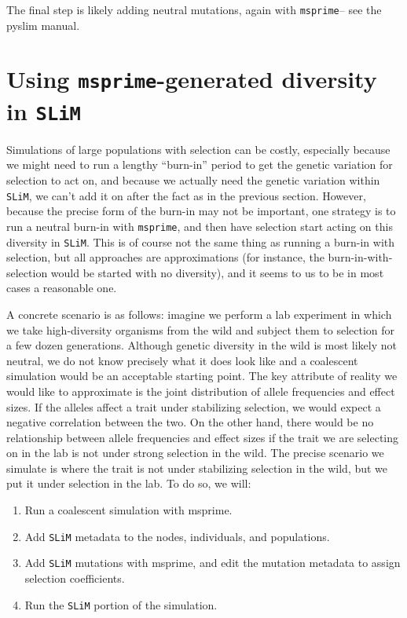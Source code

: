 \documentclass[12pt]{article}
\newcommand{\msprime}[0]{\texttt{msprime}\xspace}
\newcommand{\slim}[0]{\texttt{SLiM}\xspace}
\begin{document}
The final step is likely adding neutral mutations,
again with \msprime -- see the pyslim manual.


\section{Using \msprime-generated diversity in \slim}

Simulations of large populations with selection can be costly,
especially because we might need to run a lengthy ``burn-in'' period
to get the genetic variation for selection to act on,
and because we actually need the genetic variation within \slim,
we can't add it on after the fact as in the previous section.
However, because the precise form of the burn-in may not be important, 
one strategy is to run a neutral burn-in with \msprime,
and then have selection start acting on this diversity in \slim.
This is of course not the same thing as running a burn-in with selection,
but all approaches are approximations
(for instance, the burn-in-with-selection would be started with no diversity),
and it seems to us to be in most cases a reasonable one.

A concrete scenario is as follows:
imagine we perform a lab experiment in which
we take high-diversity organisms from the wild
and subject them to selection for a few dozen generations.
Although genetic diversity in the wild is most likely not neutral,
we do not know precisely what it does look like
and a coalescent simulation would be an acceptable starting point.
The key attribute of reality we would like to approximate
is the joint distribution of allele frequencies and effect sizes.
If the alleles affect a trait under stabilizing selection,
we would expect a negative correlation between the two.
On the other hand, there would be no relationship between allele frequencies and effect sizes
if the trait we are selecting on in the lab is not under strong selection in the wild.
The precise scenario we simulate is where the trait
is not under stabilizing selection in the wild,
but we put it under selection in the lab.
To do so, we will:
\begin{enumerate}
    \item Run a coalescent simulation with msprime.
    \item Add \slim metadata to the nodes, individuals, and populations.
    \item Add \slim mutations with msprime,
        and edit the mutation metadata to assign selection coefficients.
    \item Run the \slim portion of the simulation.
\end{enumerate}
\end{document}
